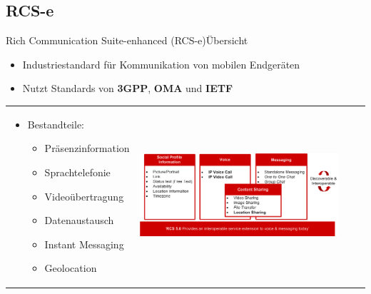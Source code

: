 \documentclass{beamer}
\begin{document}
\subsection{RCS-e}
\begin{frame}{Rich Communication Suite-enhanced (RCS-e)}{Übersicht\cite{rcs:spec}}
	\begin{itemize}
		\item Industriestandard für Kommunikation von mobilen Endgeräten
		\item Nutzt Standards von \textbf{3GPP}, \textbf{OMA} und \textbf{IETF}
	\end{itemize}
	\hspace{-0.28cm}
	\begin{tabular}{ll}
	 \begin{minipage}{0.4\textwidth}
	\begin{itemize}
		\item Bestandteile:
		\begin{itemize}
			\item Präsenzinformation
			\item Sprachtelefonie
			\item Videoübertragung
			\item Datenaustausch
			\item Instant Messaging
			\item Geolocation
		\end{itemize}
	\end{itemize}
	 \end{minipage}
	 &
	 \begin{minipage}{0.6\textwidth}
		\includegraphics[width=0.9\textwidth]{img/rcs-e-overview}
	 \end{minipage}
	\end{tabular}
\end{frame}
\end{document}
